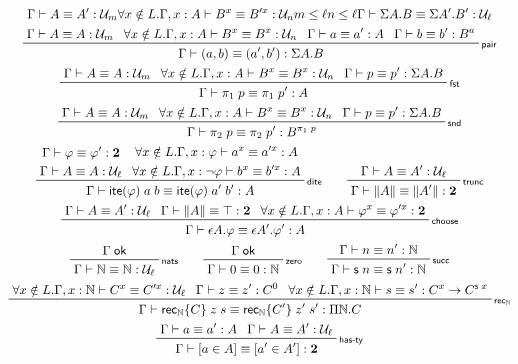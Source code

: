 \documentclass[acmsmall,screen,review]{acmart}
\newcommand{\mc}[1]{\ensuremath{\mathcal{#1}}}
\newcommand{\mb}[1]{\ensuremath{\mathbf{#1}}}
\newcommand{\ms}[1]{\ensuremath{\mathsf{#1}}}
\newcommand{\rle}[1]{{\scriptsize\textsf{#1}}}
\newcommand{\nats}{\mathbb{N}}
\newcommand{\isok}[1]{#1\;\ms{ok}}
\newcommand{\jeq}[4]{#1 \vdash #2 \equiv #3 : #4}
\newcommand{\dite}[3]{\ms{ite}(#1)\;#2\;#3}
\newcommand{\natrec}[3]{\ms{rec}_\nats\{#1\}\;#2\;#3}
\newcommand{\mhasty}[2]{[#1 \in #2]}
\newcommand{\opv}[2]{#1^{#2}}
\begin{document}
\begin{gather*}
        {\jeq{\Gamma}{A}{A'}{\mc{U}_m}}
        {\forall x \notin L .
            \jeq{\Gamma, x : A}{\opv{B}{x}}{\opv{B'}{x}}{\mc{U}_n}}
        {m \leq \ell}
        {n \leq \ell}
        {\jeq{\Gamma}{\Sigma A . B}{\Sigma A' . B'}{\mc{U}_{\ell}}} \\
    \prftree[r]{\rle{pair}}
        {\jeq{\Gamma}{A}{A}{\mc{U}_m}}
        {\forall x \notin L .
            \jeq{\Gamma, x : A}{\opv{B}{x}}{\opv{B}{x}}{\mc{U}_n}}
        {\jeq{\Gamma}{a}{a'}{A}}
        {\jeq{\Gamma}{b}{b'}{\opv{B}{a}}}
        {\jeq{\Gamma}{(a, b)}{(a', b')}{\Sigma A . B}} \\
    \prftree[r]{\rle{fst}}
        {\jeq{\Gamma}{A}{A}{\mc{U}_m}}
        {\forall x \notin L .
            \jeq{\Gamma, x : A}{\opv{B}{x}}{\opv{B}{x}}{\mc{U}_n}}
        {\jeq{\Gamma}{p}{p'}{\Sigma A . B}}
        {\jeq{\Gamma}{\pi_1\;p}{\pi_1\;p'}{A}} \\
    \prftree[r]{\rle{snd}}
        {\jeq{\Gamma}{A}{A}{\mc{U}_m}}
        {\forall x \notin L .
            \jeq{\Gamma, x : A}{\opv{B}{x}}{\opv{B}{x}}{\mc{U}_n}}
        {\jeq{\Gamma}{p}{p'}{\Sigma A . B}}
        {\jeq{\Gamma}{\pi_2\;p}{\pi_2\;p'}{\opv{B}{\pi_1\;p}}} \\
    \prftree[r]{\rle{dite}}
        {
        \prfStackPremises
        {\jeq{\Gamma}{\varphi}{\varphi'}{\mb{2}}}
        {\jeq{\Gamma}{A}{A}{\mc{U}_\ell}}
        }
        {
        \prfStackPremises
        {\forall x \notin L .
            \jeq{\Gamma, x : \varphi}{\opv{a}{x}}{\opv{a'}{x}}{A}}
        {\forall x \notin L .
            \jeq{\Gamma, x : \lnot\varphi}{\opv{b}{x}}{\opv{b'}{x}}{A}}
        }
        {\jeq{\Gamma}{\dite{\varphi}{a}{b}}{\dite{\varphi}{a'}{b'}}{A}} \qquad
    \prftree[r]{\rle{trunc}}
        {\jeq{\Gamma}{A}{A'}{\mc{U}_\ell}}
        {\jeq{\Gamma}{\|A\|}{\|A'\|}{\mb{2}}} \\
    \prftree[r]{\rle{choose}}
        {\jeq{\Gamma}{A}{A'}{\mc{U}_\ell}}
        {\jeq{\Gamma}{\|A\|}{\top}{\mb{2}}}
        {\forall x \notin L . 
            \jeq{\Gamma, x : A}{\opv{\varphi}{x}}{\opv{\varphi'}{x}}{\mb{2}}}
        {\jeq{\Gamma}{\epsilon A . \varphi}{\epsilon A' . \varphi'}{A}} \\
    \prftree[r]{\rle{nats}}
        {\isok{\Gamma}}
        {\jeq{\Gamma}{\nats}{\nats}{\mc{U}_\ell}} \qquad
    \prftree[r]{\rle{zero}}
        {\isok{\Gamma}}
        {\jeq{\Gamma}{0}{0}{\nats}} \qquad
    \prftree[r]{\rle{succ}}
        {\jeq{\Gamma}{n}{n'}{\nats}}
        {\jeq{\Gamma}{\ms{s}\;n}{\ms{s}\;n'}{\nats}} \\
    \prftree[r]{\rle{rec$_\nats$}}
        {\forall x \notin L . \jeq{\Gamma, x : \nats}{\opv{C}{x}}{\opv{C'}{x}}{\mc{U}_\ell}}
        {\jeq{\Gamma}{z}{z'}{\opv{C}{0}}}
        {\forall x \notin L . \jeq{\Gamma, x : \nats}{s}{s'}{\opv{C}{x} \to \opv{C}{\ms{s}\;x}}}
        {\jeq{\Gamma}{\natrec{C}{z}{s}}{\natrec{C'}{z'}{s'}}{\Pi \nats . C}} \\
    \prftree[r]{\rle{has-ty}}
        {\jeq{\Gamma}{a}{a'}{A}}
        {\jeq{\Gamma}{A}{A'}{\mc{U}_\ell}}
        {\jeq{\Gamma}{\mhasty{a}{A}}{\mhasty{a'}{A'}}{\mb{2}}}
\end{gather*}
\end{document}
